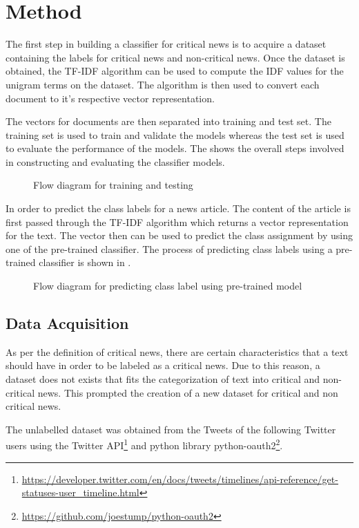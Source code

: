 \chapter{Method} \label{method}
The first step in building a classifier for critical news is to acquire a dataset containing the labels for critical news and non-critical news. Once the dataset is obtained, the TF-IDF algorithm can be used to compute the IDF values for the unigram terms on the dataset.  The algorithm is then used to convert each document to it's respective vector representation. 

The vectors for documents are then separated into training and test set. The training set is used to train and validate the models whereas the test set is used to evaluate the performance of the models. The  shows the overall steps involved in constructing and evaluating the classifier models.

\begin{figure}[h]
    \caption{Flow diagram for training and testing}
    \label{fig:training}
\end{figure}

In order to predict the class labels for a news article. The content of the article is first passed through the TF-IDF algorithm which returns a vector representation for the text. The vector then can be used to predict the class assignment by using one of the pre-trained classifier. The process of predicting class labels using a pre-trained classifier is shown in .

\begin{figure}[h]
    \caption{Flow diagram for predicting class label using pre-trained model}
    \label{fig:prediction}
\end{figure}

\section{Data Acquisition}
As per the definition of critical news, there are certain characteristics that a text should have in order to be labeled as a critical news. Due to this reason, a dataset does not exists that fits the categorization of text into critical and non-critical news. This prompted the creation of a new dataset for critical and non critical news.\par
The unlabelled dataset was obtained from the Tweets of the following Twitter users using the Twitter API\footnote{\url{https://developer.twitter.com/en/docs/tweets/timelines/api-reference/get-statuses-user_timeline.html}} and python library python-oauth2\footnote{\url{https://github.com/joestump/python-oauth2}}.

